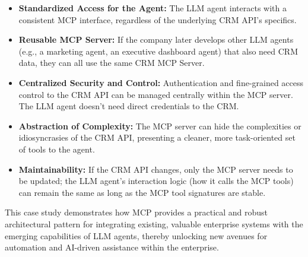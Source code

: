 \begin{itemize}
    \item \textbf{Standardized Access for the Agent:} The LLM agent interacts with a consistent MCP interface, 
    regardless of the underlying CRM API's specifics.
    \item \textbf{Reusable MCP Server:} If the company later develops other LLM agents (e.g., a marketing agent, an executive dashboard agent) 
    that also need CRM data, they can all use the same CRM MCP Server.
    \item \textbf{Centralized Security and Control:} Authentication and fine-grained access control to the CRM API can be managed centrally 
    within the MCP server. The LLM agent doesn't need direct credentials to the CRM.
    \item \textbf{Abstraction of Complexity:} The MCP server can hide the complexities or idiosyncrasies of the CRM API, presenting a 
    cleaner, more task-oriented set of tools to the agent.
    \item \textbf{Maintainability:} If the CRM API changes, only the MCP server needs to be updated; the LLM agent's interaction logic 
    (how it calls the MCP tools) can remain the same as long as the MCP tool signatures are stable.
\end{itemize}

This case study demonstrates how MCP provides a practical and robust architectural pattern for integrating existing, valuable enterprise systems 
with the emerging capabilities of LLM agents, thereby unlocking new avenues for automation and AI-driven assistance within the enterprise. 